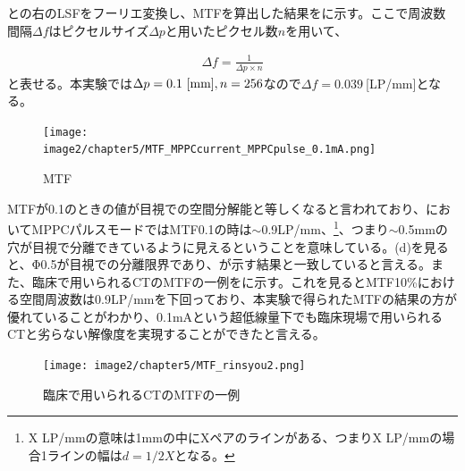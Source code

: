 との右のLSFをフーリエ変換し、MTFを算出した結果をに示す。ここで周波数間隔$\Delta f$はピクセルサイズ$\Delta p$と用いたピクセル数$n$を用いて、

\begin{align}
\Delta f = \frac{1}{\Delta p\times n}
\end{align}
と表せる。本実験では$\Delta p = 0.1\ {\rm [mm]}, n=256$なので$\Delta f = 0.039\ $[LP/mm]となる。


\begin{figure}[H]
 \begin{center}
 \texttt{[image: image2/chapter5/MTF\_MPPCcurrent\_MPPCpulse\_0.1mA.png]} 
 \end{center}
 \caption{MTF}
 \label{fig:MTF_matome}
\end{figure}

MTFが0.1のときの値が目視での空間分解能と等しくなると言われており、においてMPPCパルスモードではMTF0.1の時は$\sim$0.9LP/mm、\footnote{X LP/mmの意味は1mmの中にXペアのラインがある、つまりX LP/mmの場合1ラインの幅は$d=1/2X$となる。}、つまり$\sim$0.5mmの穴が目視で分離できているように見えるということを意味している。(d)を見ると、Φ0.5が目視での分離限界であり、が示す結果と一致していると言える。また、臨床で用いられるCTのMTFの一例をに示す。これを見るとMTF10\%における空間周波数は0.9LP/mmを下回っており、本実験で得られたMTFの結果の方が優れていることがわかり、0.1mAという超低線量下でも臨床現場で用いられるCTと劣らない解像度を実現することができたと言える。

\begin{figure}[H]
 \begin{center}
 \texttt{[image: image2/chapter5/MTF\_rinsyou2.png]} 
 \end{center}
 \caption{臨床で用いられるCTのMTFの一例}
 \label{fig:MTF_rinshou}
\end{figure}